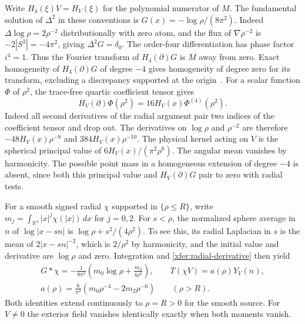 \documentclass[11pt]{article}
\numberwithin{equation}{section}
\theoremstyle{definition}
\theoremstyle{remark}
\begin{document}
Write \(H_4(\xi)V=H_V(\xi)\) for the polynomial numerator of \(M\).
The fundamental solution of \(\Delta^2\) in these conventions is
\(G(x)=-\log\rho/(8\pi^2)\). Indeed
\(\Delta\log\rho=2\rho^{-2}\) distributionally with zero atom,
and the flux of \(\nabla\rho^{-2}\) is \(-2|S^3|=-4\pi^2\),
giving \(\Delta^2G=\delta_0\). The order-four differentiation
has phase factor \(i^4=1\). Thus the Fourier transform of
\(H_4(\partial)G\) is \(M\) away from zero. Exact homogeneity of
\(H_4(\partial)G\) of degree \(-4\) gives homogeneity of degree
zero for its transform, excluding a discrepancy supported at the
origin~\cite[Theorem~4.19]{Dyatlov2022Elliptic}.
For a scalar function \(\Phi\) of \(\rho^2\), the trace-free
quartic coefficient tensor gives
\begin{equation}\label{xfer:radial-derivative}
 H_V(\partial)\Phi(\rho^2)=16H_V(x)\Phi^{(4)}(\rho^2).
\end{equation}
Indeed all second derivatives of the radial argument pair two
indices of the coefficient tensor and drop out. The derivatives
on \(\log\rho\) and \(\rho^{-2}\) are therefore
\(-48H_V(x)\rho^{-8}\) and \(384H_V(x)\rho^{-10}\).
The physical kernel acting on \(V\) is the spherical principal
value of \(6H_V(x)/(\pi^2\rho^8)\). The angular mean vanishes
by harmonicity. The possible point mass in a homogeneous
extension of degree \(-4\) is absent, since both this principal
value and \(H_V(\partial)G\) pair to zero with radial tests.

For a smooth signed radial \(\chi\) supported in \(\{\rho\le R\}\),
write \(m_j=\int_{\mathbb R^4}|x|^j\chi(|x|)\,dx\) for \(j=0,2\).
For \(s<\rho\), the normalized sphere average in \(n\) of
\(\log|x-sn|\) is \(\log\rho+s^2/(4\rho^2)\). To see this,
its radial Laplacian in \(s\) is the mean of
\(2|x-sn|^{-2}\), which is \(2/\rho^2\) by harmonicity, and
the initial value and derivative are \(\log\rho\) and zero.
Integration and \eqref{xfer:radial-derivative} then yield
\begin{equation}\label{xfer:radial}
 \begin{gathered}
 G*\chi=-\frac1{8\pi^2}\left(m_0\log\rho+\frac{m_2}{4\rho^2}\right),
 \qquad T(\chi V)=a(\rho)Y_V(n),\\
 a(\rho)=\frac6{\pi^2}\left(m_0\rho^{-4}-2m_2\rho^{-6}\right)
 \qquad(\rho>R).
 \end{gathered}
\end{equation}
Both identities extend continuously to \(\rho=R>0\) for the
smooth source. For \(V\ne0\) the exterior field vanishes
identically exactly when both moments vanish.
\end{document}
